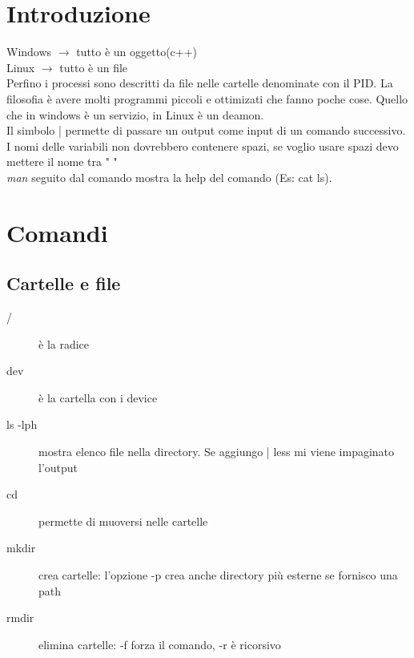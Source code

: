\chapter{Introduzione}
Windows $\longrightarrow$ tutto è un oggetto(c++)\\
Linux $\longrightarrow$ tutto è un file\\
Perfino i processi sono descritti da file nelle cartelle denominate con il PID.
La filosofia è avere molti programmi piccoli e ottimizati che fanno poche cose. Quello che in windows è un servizio, in Linux è un deamon.\\
Il simbolo | permette di passare un output come input di un comando successivo.\\
I nomi delle variabili non dovrebbero contenere spazi, se voglio usare spazi devo mettere il nome tra " "\\
\textit{man} seguito dal comando mostra la help del comando (Es: cat ls).

\chapter{Comandi}
\section{Cartelle e file}
\begin{description}
\item [/] è la radice\\
\item [dev] è la cartella con i device\\
\item [ls -lph] mostra elenco file nella directory. Se aggiungo  | less mi viene impaginato l'output\\
\item [cd] permette di muoversi nelle cartelle\\
\item [mkdir] crea cartelle: l'opzione -p crea anche directory più esterne se fornisco una path\\
\item [rmdir] elimina cartelle: -f forza il comando, -r è ricorsivo\\
\end{description}

